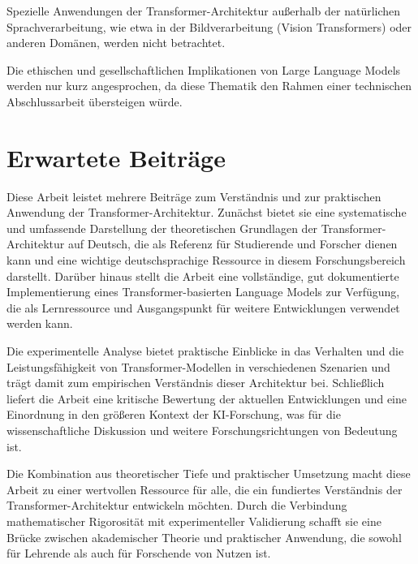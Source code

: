 Spezielle Anwendungen der Transformer-Architektur außerhalb der natürlichen Sprachverarbeitung, wie etwa in der Bildverarbeitung (Vision Transformers) oder anderen Domänen, werden nicht betrachtet.

Die ethischen und gesellschaftlichen Implikationen von Large Language Models werden nur kurz angesprochen, da diese Thematik den Rahmen einer technischen Abschlussarbeit übersteigen würde.

\section{Erwartete Beiträge}

Diese Arbeit leistet mehrere Beiträge zum Verständnis und zur praktischen Anwendung der Transformer-Architektur. Zunächst bietet sie eine systematische und umfassende Darstellung der theoretischen Grundlagen der Transformer-Architektur auf Deutsch, die als Referenz für Studierende und Forscher dienen kann und eine wichtige deutschsprachige Ressource in diesem Forschungsbereich darstellt. Darüber hinaus stellt die Arbeit eine vollständige, gut dokumentierte Implementierung eines Transformer-basierten Language Models zur Verfügung, die als Lernressource und Ausgangspunkt für weitere Entwicklungen verwendet werden kann.

Die experimentelle Analyse bietet praktische Einblicke in das Verhalten und die Leistungsfähigkeit von Transformer-Modellen in verschiedenen Szenarien und trägt damit zum empirischen Verständnis dieser Architektur bei. Schließlich liefert die Arbeit eine kritische Bewertung der aktuellen Entwicklungen und eine Einordnung in den größeren Kontext der KI-Forschung, was für die wissenschaftliche Diskussion und weitere Forschungsrichtungen von Bedeutung ist.

Die Kombination aus theoretischer Tiefe und praktischer Umsetzung macht diese Arbeit zu einer wertvollen Ressource für alle, die ein fundiertes Verständnis der Transformer-Architektur entwickeln möchten. Durch die Verbindung mathematischer Rigorosität mit experimenteller Validierung schafft sie eine Brücke zwischen akademischer Theorie und praktischer Anwendung, die sowohl für Lehrende als auch für Forschende von Nutzen ist.